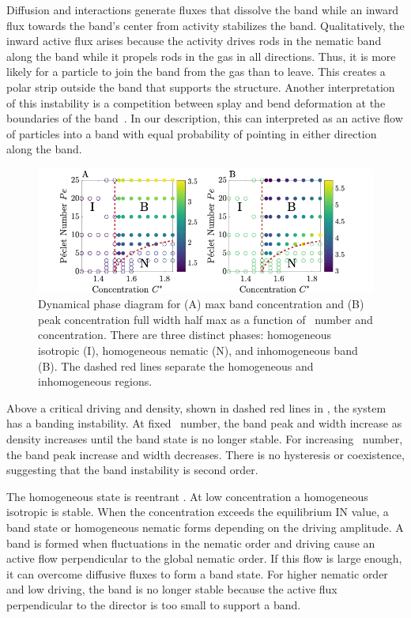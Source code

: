 Diffusion and interactions generate fluxes that dissolve the band while  an
inward flux towards the band's center from  activity stabilizes the band.
Qualitatively, the inward active flux arises because the activity drives rods in
the nematic band along the band while it propels rods in the gas in all
directions. Thus, it is more likely for a particle to join the band from the gas
than to leave.  This creates a polar strip outside the band that supports the
structure.  Another interpretation of this instability is a competition between
splay and bend deformation at the boundaries of the
band~\cite{baskaran_hydrodynamics_08}.  In our description, this can interpreted
as an active flow of particles into a band with equal probability of pointing in
either direction along the band.

\begin{figure}[!b]
	\centering
  \includegraphics[width=1.0\textwidth]{figs/ch04_active/phase_diagram_paper.png}
  \caption[Dynamical phase diagram]
  {Dynamical phase diagram for (A) max band concentration and (B) peak
    concentration full width half max as a function of \peclet~number and
    concentration. There are three distinct phases: homogeneous isotropic (I),
    homogeneous nematic (N), and inhomogeneous band (B). The dashed red lines
    separate the homogeneous and inhomogeneous regions.}\label{fig:phase_diagram}
\end{figure}

Above a critical driving and density, shown in dashed red lines in
, the system has a banding instability.  At fixed
\peclet~number, the band peak and width increase as density increases until the
band state is no longer stable. For increasing \peclet~number, the band peak
increase and width decreases. There is
no hysteresis or coexistence, suggesting that the band instability is second
order.

The homogeneous state is reentrant .  At low concentration a homogeneous isotropic is
stable. When the concentration exceeds the equilibrium IN value, a band state or
homogeneous nematic forms depending on the driving amplitude.  A band is formed
when fluctuations in the nematic order and driving cause an active flow
perpendicular to the global nematic order.  If this flow is large enough, it can
overcome diffusive fluxes to form a band state.  For higher nematic order and
low driving, the band is no longer stable because the active flux perpendicular
to the director is too small to support a band.

